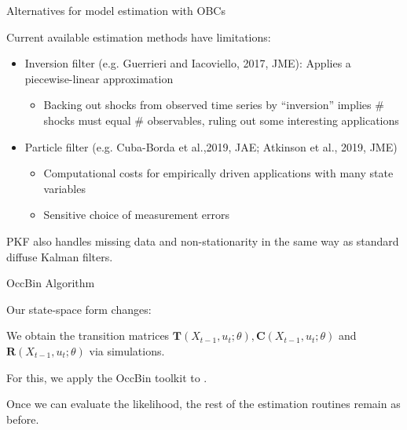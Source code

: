  
\begin{frame}{Alternatives for model estimation with OBCs}
\label{lit}
	\begin{wideitemize}
	\item Current available estimation methods have limitations: 
	\begin{itemize}
		\item Inversion filter (e.g. Guerrieri and Iacoviello, 2017, JME): Applies a piecewise-linear approximation
		 \begin{itemize}
		\item Backing out shocks from observed time series by ``inversion'' implies \# shocks must equal \# observables, ruling out some interesting applications
\end{itemize}
	\item Particle filter (e.g. Cuba-Borda et al.,2019, JAE; Atkinson et al., 2019, JME)
    \begin{itemize}
    \item Computational costs for empirically driven applications with many state variables 
    \item Sensitive choice of measurement errors
    \end{itemize}
	\end{itemize}
\item PKF also handles missing data and non-stationarity in the same way as standard diffuse Kalman filters.
\end{wideitemize}
\hyperlink{details_lit}{}
\end{frame}



\begin{frame}{OccBin Algorithm}
\begin{wideitemize}
\item Our state-space form changes:
\item We obtain the transition matrices $\mathbf{T}(X_{t-1},u_t;\theta), \mathbf{C}(X_{t-1},u_t;\theta)$ and $\mathbf{R}(X_{t-1},u_t;\theta)$ via simulations.
\item For this, we apply the OccBin toolkit to .
\item Once we can evaluate the likelihood, the rest of the estimation routines remain as before.
\end{wideitemize}
\end{frame}


